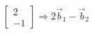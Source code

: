 \documentclass[preview]{standalone}
\begin{document}
\begin{align*}
\begin{bmatrix}2\\-1\end{bmatrix} \Rightarrow 2\vec b_1 - \vec b_2
\end{align*}
\end{document}
